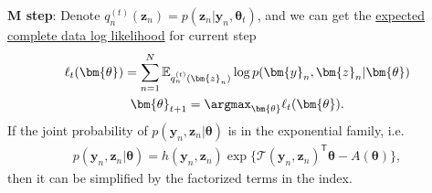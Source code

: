 \textbf{M step}: 
Denote $q^{(t)}_n(\bm{z}_n)=p(\bm{z}_n|\bm{y}_n,\bm{\theta}_{t})$, and we can get the \uline{expected complete data log likelihood} for current step
\begin{gather}
    \ell_{t}(\bm{\theta})=\sum_{n=1}^N\mathbb{E}_{q^{(t)}_n(\bm{z}_n)}\log p(\bm{y}_n,\bm{z}_n|\bm{\theta})\\
    \bm{\theta}_{t+1}=\argmax_{\bm{\theta}}\ell_{t}(\bm{\theta}).
\end{gather}
If the joint probability of $p(\bm{y}_n,\bm{z}_n|\bm{\theta})$ is in the exponential family,
i.e. 
\begin{gather}
    p(\bm{y}_n,\bm{z}_n|\bm{\theta})=h(\bm{y}_n,\bm{z}_n)\exp\{\mathcal{T}(\bm{y}_n,\bm{z}_n)^\mathsf{T}\bm{\theta}-A(\bm{\theta})\},
\end{gather}
then it can be simplified by the factorized terms in the index.




